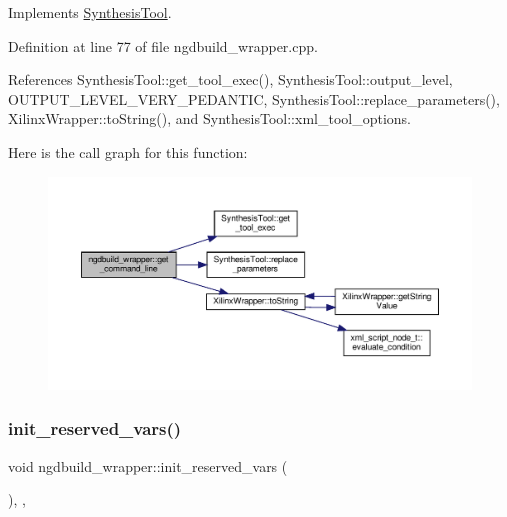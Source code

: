 Implements \hyperlink{classSynthesisTool_a8eb2ef7a6230a997a2467d298613c045}{Synthesis\+Tool}.



Definition at line 77 of file ngdbuild\+\_\+wrapper.\+cpp.



References Synthesis\+Tool\+::get\+\_\+tool\+\_\+exec(), Synthesis\+Tool\+::output\+\_\+level, O\+U\+T\+P\+U\+T\+\_\+\+L\+E\+V\+E\+L\+\_\+\+V\+E\+R\+Y\+\_\+\+P\+E\+D\+A\+N\+T\+IC, Synthesis\+Tool\+::replace\+\_\+parameters(), Xilinx\+Wrapper\+::to\+String(), and Synthesis\+Tool\+::xml\+\_\+tool\+\_\+options.

Here is the call graph for this function\+:
\nopagebreak
\begin{figure}[H]
\begin{center}
\leavevmode
\includegraphics[width=350pt]{de/d59/classngdbuild__wrapper_a9ce156e74518cda8ec42ff2e5bc43237_cgraph}
\end{center}
\end{figure}
\mbox{\label{classngdbuild__wrapper_a5be42dfc012dc28753f35ddddd890181}} 
\subsubsection{\texorpdfstring{init\+\_\+reserved\+\_\+vars()}{init\_reserved\_vars()}}
{\footnotesize\ttfamily void ngdbuild\+\_\+wrapper\+::init\+\_\+reserved\+\_\+vars (\begin{DoxyParamCaption}{ }\end{DoxyParamCaption})\hspace{0.3cm}{\ttfamily [override]}, {\ttfamily [protected]}, {\ttfamily [virtual]}}




